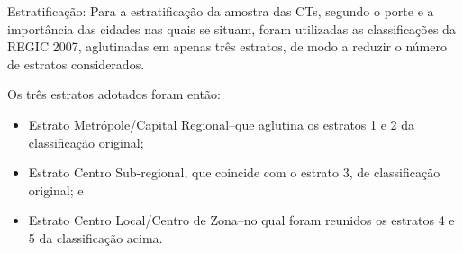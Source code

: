 
\begin{block}{Estratificação:}
	Para a estratificação da amostra das CTs, segundo o porte e a importância das cidades nas quais se situam, foram utilizadas as classificações da REGIC 2007, aglutinadas em apenas três estratos, de modo a reduzir o número de estratos considerados.
\end{block}




\begin{block}{Os três estratos adotados foram então:}
\begin{itemize}
\item Estrato Metrópole/Capital Regional--que aglutina os estratos 1 e 2 da classificação original;
\item Estrato Centro Sub-regional, que coincide com o estrato 3, de classificação original; e
\item Estrato Centro Local/Centro de Zona--no qual foram reunidos os estratos 4 e 5 da
classificação acima.
\end{itemize}
	
\end{block}